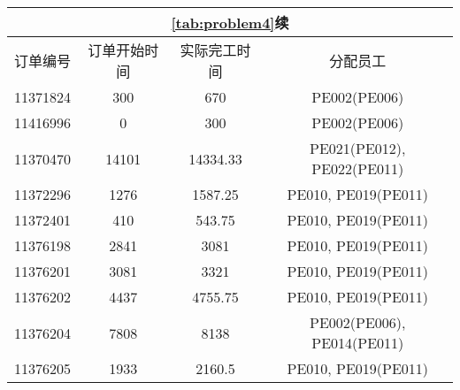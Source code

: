 \begin{appendices}
\begin{center}
\begin{longtable}{|c|c|c|c|}
\multicolumn{4}{c}{\textbf{\cref{tab:problem4}续}} \\
\hline
订单编号     & 订单开始时间 & 实际完工时间 & 分配员工 \\
\hline
\endhead

11371824 & 300   & 670     &PE002(PE006)
 \\ \hline
11416996 & 0     & 300   &PE002(PE006)
   \\ \hline
11370470 & 14101 & 14334.33 &PE021(PE012), PE022(PE011)
\\ \hline
11372296 & 1276  & 1587.25 &PE010, PE019(PE011)
 \\ \hline
11372401 & 410   & 543.75 &PE010, PE019(PE011)
  \\ \hline
11376198 & 2841  & 3081   &PE010, PE019(PE011)
  \\ \hline
11376201 & 3081  & 3321   & PE010, PE019(PE011)
  \\ \hline
11376202 & 4437  & 4755.75 &PE010, PE019(PE011)
 \\ \hline
11376204 & 7808  & 8138  &PE002(PE006), PE014(PE011)
   \\ \hline
11376205 & 1933  & 2160.5  &PE010, PE019(PE011)
 \\ \hline

\end{longtable}
\end{center}





\end{appendices}

